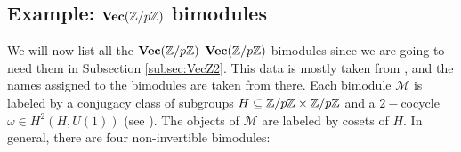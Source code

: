 
\subsection{Example: $\textbf{Vec}(\mathbb{Z}/p\mathbb{Z})$ bimodules}

We will now list all the $\textbf{Vec}(\mathbb{Z}/p\mathbb{Z})$-$\textbf{Vec}(\mathbb{Z}/p\mathbb{Z})$ bimodules since we are going to need them in Subsection \ref{subsec:VecZ2}. This data is mostly taken from \cite{BBJ19}, and the names assigned to the bimodules are taken from there. Each bimodule $\mathcal{M}$ is labeled by a conjugacy class of subgroups $H\subseteq\mathbb{Z}/p\mathbb{Z}\times\mathbb{Z}/p\mathbb{Z}$ and a $2-$cocycle $\omega\in H^2(H,U(1))$ (see \cite{Etingof2015}). The objects of $\mathcal{M}$ are labeled by cosets of $H$. In general, there are four non-invertible bimodules: 
